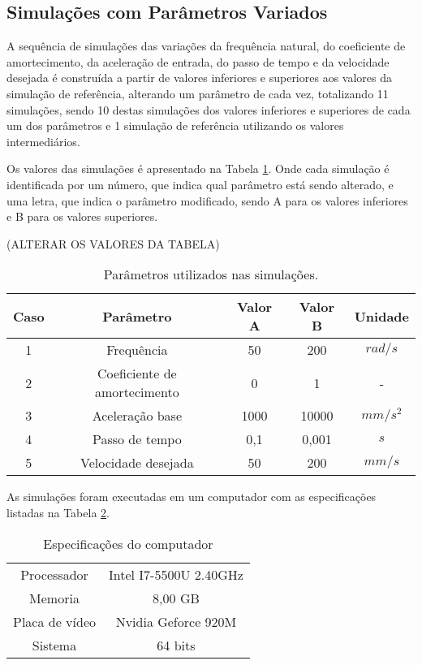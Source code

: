 \subsection{Simulações com Parâmetros Variados}
A sequência de simulações das variações da frequência natural, do coeficiente de amortecimento, da aceleração de entrada, do passo de tempo e da velocidade desejada é construída a partir de valores inferiores e superiores aos valores da simulação de referência, alterando um parâmetro de cada vez, totalizando 11 simulações, sendo 10 destas simulações dos valores inferiores e superiores de cada um dos parâmetros e 1 simulação de referência utilizando os valores intermediários. %

Os valores das simulações é apresentado na Tabela \ref{tab:sim_params}. Onde cada simulação é identificada por um número, que indica qual parâmetro está sendo alterado, e uma letra, que indica o parâmetro modificado, sendo A para os valores inferiores e B para os valores superiores. %

(ALTERAR OS VALORES DA TABELA)%

\begin{table}
    \begin{center}
    \caption{Parâmetros utilizados nas simulações.}
    \label{tab:sim_params}
    \begin{tabular}{c c c c c}
        Caso & Parâmetro & Valor A & Valor B & Unidade\\ \hline
        1 & Frequência & 50 & 200 & $rad/s$\\
        2 & Coeficiente de amortecimento & 0 & 1 & - \\
        3 & Aceleração base & 1000 & 10000 & $mm/s^2$ \\
        4 & Passo de tempo & 0,1 & 0,001 & $s$ \\
        5 & Velocidade desejada & 50 & 200 & $mm/s$ \\ \hline
    \end{tabular}
    \end{center}
\end{table}

As simulações foram executadas em um computador com as especificações listadas na Tabela \ref{tab:note_config}.

\begin{table}
    \begin{center}
    \caption{Especificações do computador}
    \label{tab:note_config}
    \begin{tabular}{c c}
        \hline
        Processador & Intel I7-5500U 2.40GHz \\
        Memoria & 8,00 GB \\
        Placa de vídeo & Nvidia Geforce 920M \\
        Sistema & 64 bits \\ \hline
    \end{tabular}
    \end{center}
\end{table}

